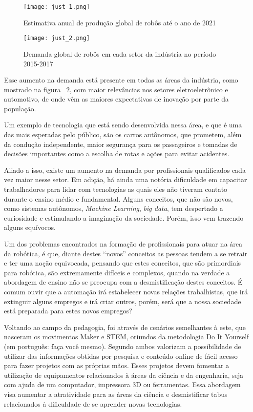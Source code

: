 \begin{figure}[h!]										\caption{Estimativa anual de produção global de robôs até o ano de 2021} \label{fig:just_1}		
	\centering										
	\texttt{[image: just\_1.png]}
\end{figure}

\begin{figure}[h!]										\caption{Demanda global de robôs em cada setor da indústria no período 2015-2017} \label{fig:just_2}		
	\centering										
	\texttt{[image: just\_2.png]}
\end{figure}

Esse aumento na demanda está presente em todas as áreas da indústria, como mostrado na figura ~\ref{fig:just_2}, com maior relevâncias nos setores eletroeletrônico e automotivo, de onde vêm as maiores expectativas de inovação por parte da população.
 
Um exemplo de tecnologia que está sendo desenvolvida nessa área, e que é uma das mais esperadas pelo público, são os carros autônomos, que prometem, além da condução independente, maior segurança para os passageiros e tomadas de decisões importantes como a escolha de rotas e ações para evitar acidentes.

Aliado a isso, existe um aumento na demanda por profissionais qualificados cada vez maior nesse setor. Em adição, há ainda uma notória dificuldade em capacitar trabalhadores para lidar com tecnologias as quais eles não tiveram contato durante o ensino médio e fundamental. Alguns conceitos, que não são novos, como sistemas autônomos, \textit{Machine Learning}, \textit{big data}, tem despertado a curiosidade e estimulando a imaginação da sociedade. Porém, isso vem trazendo alguns equívocos.

Um dos problemas encontrados na formação de profissionais para atuar na área da robótica, é que, diante destes “novos” conceitos as pessoas tendem a se retrair e ter uma noção equivocada, pensando que estes conceitos, que são primordiais para robótica, são extremamente difíceis e complexos, quando na verdade a abordagem de ensino não se preocupa com a desmistificação destes conceitos. É comum ouvir que a automação irá estabelecer novas relações trabalhistas, que irá extinguir alguns empregos e irá criar outros, porém, será que a nossa sociedade está preparada para estes novos empregos? 

Voltando ao campo da pedagogia, foi através de cenários semelhantes à este, que nasceram os movimentos Maker e STEM, oriundos da metodologia Do It Yourself (em português: faça você mesmo). Segundo \cite{Pugliese} ambos valorizam a possibilidade de utilizar das informações obtidas por pesquisa e conteúdo online de fácil acesso para fazer projetos com as próprias mãos. Esses projetos devem fomentar a utilização de equipamentos relacionados à áreas da ciência e da engenharia, seja com ajuda de um computador, impressora 3D ou ferramentas. Essa abordagem visa aumentar a atratividade para as áreas da ciência e desmistificar tabus relacionados à dificuldade de se aprender novas tecnologias.
 
